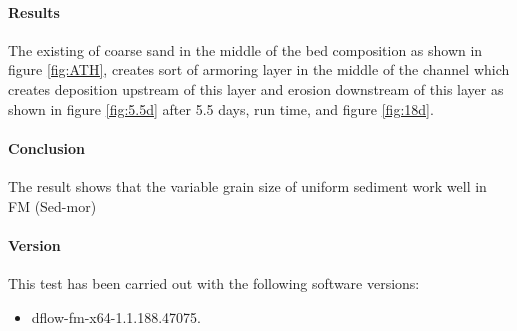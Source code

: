\paragraph*{Results}

The existing of coarse sand in the middle of the bed composition as shown in figure \ref{fig:ATH}, creates sort of armoring layer in the middle of the channel which creates deposition upstream of this layer and erosion downstream of this layer as shown in figure \ref{fig:5.5d} after 5.5 days, run time, and figure \ref{fig:18d}.

\paragraph*{Conclusion}
The result shows that the variable grain size of uniform sediment work well in FM (Sed-mor)
\paragraph*{Version}
This test has been carried out with the following software versions:
\begin{itemize}
	
	\item[$\bullet$] dflow-fm-x64-1.1.188.47075. 
	
\end{itemize}

%
